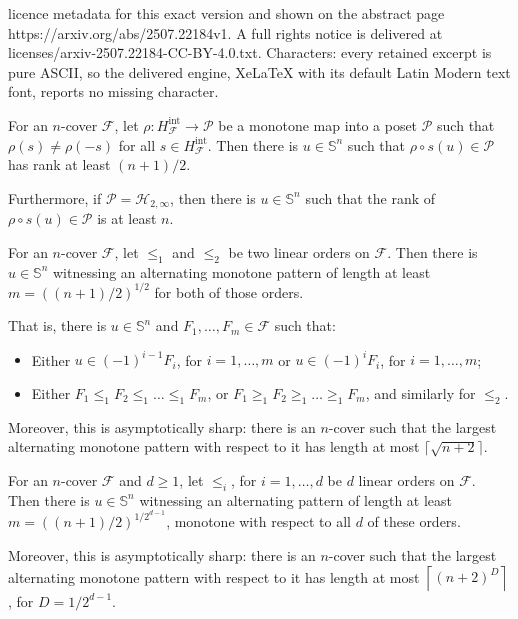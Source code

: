 \documentclass[10pt,a4paper]{amsart}
\newcommand{\F}{\mathcal{F}}
\newcommand{\PP}{\mathcal{P}}
\newcommand{\intr}{\mathrm{int}}
\renewcommand{\H}{\mathcal{H}}
\renewcommand{\SS}{\mathbb{S}}
\begin{document}
licence metadata for this exact version and shown on the abstract page https://arxiv.org/abs/2507.22184v1. A full rights notice is delivered at licenses/arxiv-2507.22184-CC-BY-4.0.txt. Characters: every retained excerpt is pure ASCII, so the delivered engine, XeLaTeX with its default Latin Modern text font, reports no missing character.
\begin{lemma}\label{lem-Ky-Fan-generalized}
	For an $n$-cover $\F$, let $\rho\colon H^\intr_\F\rightarrow \PP$ be a monotone map into a poset $\PP$ such that $\rho(s) \neq \rho(-s)$ for all $s\in H^\intr_\F$. Then there is $u\in \SS^n$ such that $\rho\circ s(u)\in \PP$ has rank at least $(n + 1)/2$. %
	
	Furthermore, if $\PP = \H_{2, \infty}$, then there is $u\in \SS^n$ such that the rank of $\rho\circ s(u)\in \PP$ is at least $n$.
\end{lemma}

\begin{theorem}\label{th-kyfan-covers2}
	For an $n$-cover $\F$, let $\leq_1$ and $\leq_2$ be two linear orders on $\F$. Then there is $u\in \SS^n$ witnessing an alternating monotone pattern of length at least $m = \left((n+1)/2\right)^{1/2}$ for both of those orders. 
	
	That is, there is $u\in \SS^n$ and $F_1, \dots, F_m\in \F$ such that:
	\begin{itemize}
		\item Either $u\in (-1)^{i-1}F_i$, for $i=1, \dots, m$ or $u\in (-1)^{i}F_i$, for $i=1, \dots, m$;
		\item Either $F_1\leq_1 F_2 \leq_1 \dots \leq_1 F_m$, or $F_1\geq_1 F_2 \geq_1 \dots \geq_1 F_m$, and similarly for $\leq_2$.
	\end{itemize}
    
    Moreover, this is asymptotically sharp: there is an $n$-cover such that the largest alternating monotone pattern with respect to it has length at most $\lceil\sqrt{n+2}\rceil$.
\end{theorem}

\begin{theorem}\label{th-kyfan-covers3}
	For an $n$-cover $\F$ and $d\geq 1$, let $\leq_i$, for $i=1, \dots, d$ be $d$ linear orders on $\F$. Then there is $u\in \SS^n$ witnessing an alternating pattern of length at least $m = \left((n+1)/2\right)^{1/2^{d-1}}$, monotone with respect to all $d$ of these orders. 

    Moreover, this is asymptotically sharp: there is an $n$-cover such that the largest alternating monotone pattern with respect to it has length at most $\left\lceil(n+2)^{D}\right\rceil$, for $D = 1/2^{d-1}$.
\end{theorem}
\end{document}
